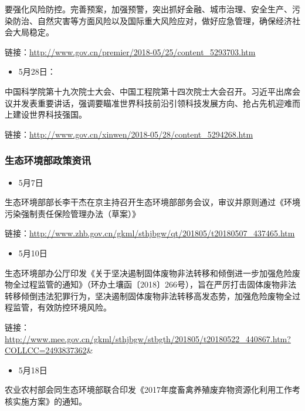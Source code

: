 \documentclass[]{book}
\providecommand{\tightlist}{%
  \setlength{\itemsep}{0pt}\setlength{\parskip}{0pt}}
\begin{document}
要强化风险防控。完善预案，加强预警，突出抓好金融、城市治理、安全生产、污染防治、自然灾害等方面风险以及国际重大风险应对，做好应急管理，确保经济社会大局稳定。

链接：\url{http://www.gov.cn/premier/2018-05/25/content_5293703.htm}

\begin{itemize}
\tightlist
\item
  5月28日：
\end{itemize}

中国科学院第十九次院士大会、中国工程院第十四次院士大会召开。习近平出席会议并发表重要讲话，强调要瞄准世界科技前沿引领科技发展方向、抢占先机迎难而上建设世界科技强国。

链接：\url{http://www.gov.cn/xinwen/2018-05/28/content_5294268.htm}

\subsubsection*{生态环境部政策资讯}\label{-1}

\begin{itemize}
\tightlist
\item
  5月7日
\end{itemize}

生态环境部部长李干杰在京主持召开生态环境部部务会议，审议并原则通过《环境污染强制责任保险管理办法（草案）》

链接：\url{http://www.zhb.gov.cn/gkml/sthjbgw/qt/201805/t20180507_437465.htm}

\begin{itemize}
\tightlist
\item
  5月10日
\end{itemize}

生态环境部办公厅印发《关于坚决遏制固体废物非法转移和倾倒进一步加强危险废物全过程监管的通知》（环办土壤函〔2018〕266号），旨在严厉打击固体废物非法转移倾倒违法犯罪行为，坚决遏制固体废物非法转移高发态势，加强危险废物全过程监管，有效防控环境风险。

链接：\url{http://www.mee.gov.cn/gkml/sthjbgw/stbgth/201805/t20180522_440867.htm?COLLCC=2493837362}\&

\begin{itemize}
\tightlist
\item
  5月18日
\end{itemize}

农业农村部会同生态环境部联合印发《2017年度畜禽养殖废弃物资源化利用工作考核实施方案》的通知。
\end{document}
